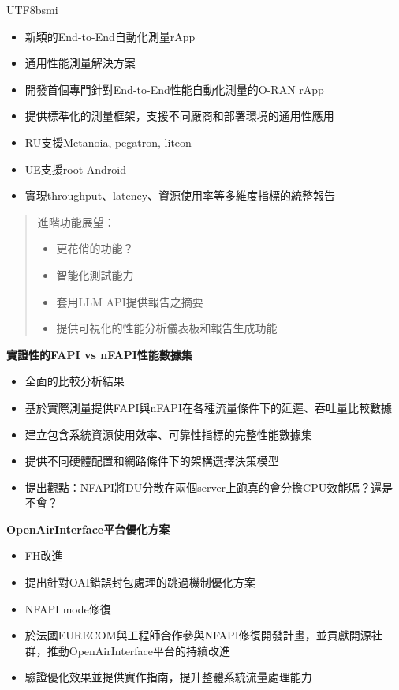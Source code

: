 \documentclass[conference]{IEEEtran}
\begin{document}
\begin{CJK}{UTF8}{bsmi}
{\begin{itemize}
    \item 新穎的End-to-End自動化測量rApp
    \item 通用性能測量解決方案
    \item 開發首個專門針對End-to-End性能自動化測量的O-RAN rApp
    \item 提供標準化的測量框架，支援不同廠商和部署環境的通用性應用
    \item RU支援Metanoia, pegatron, liteon
    \item UE支援root Android
    \item 實現throughput、latency、資源使用率等多維度指標的統整報告
\end{itemize}

\begin{quote}
進階功能展望：
\begin{itemize}
    \item 更花俏的功能？
    \item 智能化測試能力
    \item 套用LLM API提供報告之摘要
    \item 提供可視化的性能分析儀表板和報告生成功能
\end{itemize}
\end{quote}


\textbf{實證性的FAPI vs nFAPI性能數據集}
\begin{itemize}
    \item 全面的比較分析結果
    \item 基於實際測量提供FAPI與nFAPI在各種流量條件下的延遲、吞吐量比較數據
    \item 建立包含系統資源使用效率、可靠性指標的完整性能數據集
    \item 提供不同硬體配置和網路條件下的架構選擇決策模型
    \item 提出觀點：NFAPI將DU分散在兩個server上跑真的會分擔CPU效能嗎？還是不會？
\end{itemize}

\textbf{OpenAirInterface平台優化方案}
\begin{itemize}
    \item FH改進
    \item 提出針對OAI錯誤封包處理的跳過機制優化方案
    \item NFAPI mode修復
    \item 於法國EURECOM與工程師合作參與NFAPI修復開發計畫，並貢獻開源社群，推動OpenAirInterface平台的持續改進
    \item 驗證優化效果並提供實作指南，提升整體系統流量處理能力
\end{itemize}

}
\end{CJK}
\end{document}
